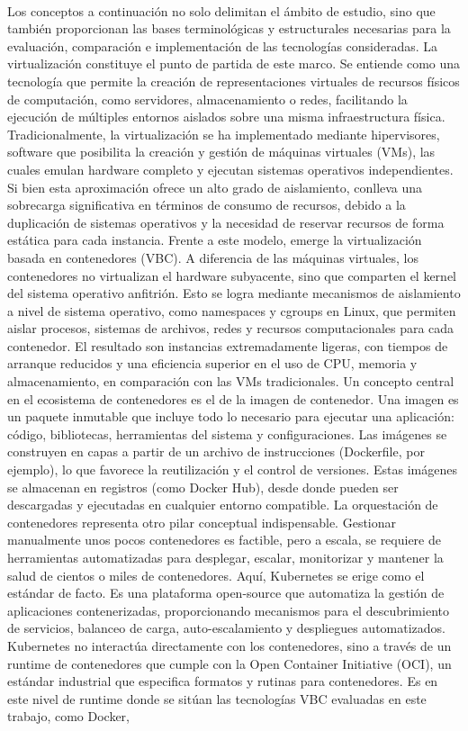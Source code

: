 \label{cap:marcoConceptual}
\mbox{}\\
Los conceptos a continuación no solo delimitan el ámbito de estudio, sino que también proporcionan las bases terminológicas y estructurales necesarias para la evaluación, comparación e implementación de las tecnologías consideradas. La virtualización constituye el punto de partida de este marco. Se entiende como una tecnología que permite la creación de representaciones virtuales de recursos físicos de computación, como servidores, almacenamiento o redes, facilitando la ejecución de múltiples entornos aislados sobre una misma infraestructura física. Tradicionalmente, la virtualización se ha implementado mediante hipervisores, software que posibilita la creación y gestión de máquinas virtuales (VMs), las cuales emulan hardware completo y ejecutan sistemas operativos independientes. Si bien esta aproximación ofrece un alto grado de aislamiento, conlleva una sobrecarga significativa en términos de consumo de recursos, debido a la duplicación de sistemas operativos y la necesidad de reservar recursos de forma estática para cada instancia. Frente a este modelo, emerge la virtualización basada en contenedores (VBC). A diferencia de las máquinas virtuales, los contenedores no virtualizan el hardware subyacente, sino que comparten el kernel del sistema operativo anfitrión. Esto se logra mediante mecanismos de aislamiento a nivel de sistema operativo, como namespaces y cgroups en Linux, que permiten aislar procesos, sistemas de archivos, redes y recursos computacionales para cada contenedor. El resultado son instancias extremadamente ligeras, con tiempos de arranque reducidos y una eficiencia superior en el uso de CPU, memoria y almacenamiento, en comparación con las VMs tradicionales. Un concepto central en el ecosistema de contenedores es el de la imagen de contenedor. Una imagen es un paquete inmutable que incluye todo lo necesario para ejecutar una aplicación: código, bibliotecas, herramientas del sistema y configuraciones. Las imágenes se construyen en capas a partir de un archivo de instrucciones (Dockerfile, por ejemplo), lo que favorece la reutilización y el control de versiones. Estas imágenes se almacenan en registros (como Docker Hub), desde donde pueden ser descargadas y ejecutadas en cualquier entorno compatible. La orquestación de contenedores representa otro pilar conceptual indispensable. Gestionar manualmente unos pocos contenedores es factible, pero a escala, se requiere de herramientas automatizadas para desplegar, escalar, monitorizar y mantener la salud de cientos o miles de contenedores. Aquí, Kubernetes se erige como el estándar de facto. Es una plataforma open-source que automatiza la gestión de aplicaciones contenerizadas, proporcionando mecanismos para el descubrimiento de servicios, balanceo de carga, auto-escalamiento y despliegues automatizados. Kubernetes no interactúa directamente con los contenedores, sino a través de un runtime de contenedores que cumple con la Open Container Initiative (OCI), un estándar industrial que especifica formatos y rutinas para contenedores. Es en este nivel de runtime donde se sitúan las tecnologías VBC evaluadas en este trabajo, como Docker, 